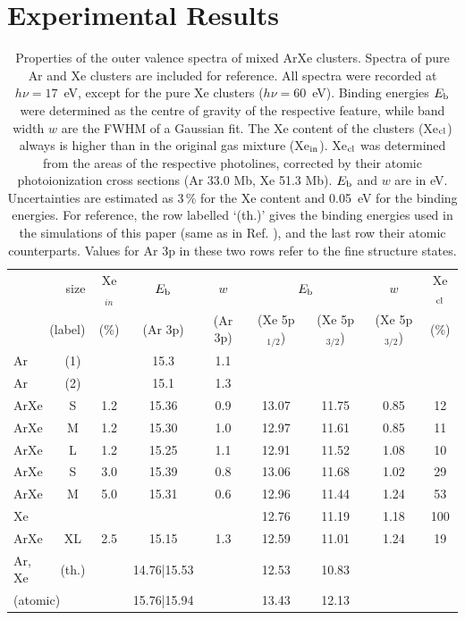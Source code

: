 \section{Experimental Results
\label{sec:exp_results}}


\begin{table}
\caption{Properties of the outer valence spectra of mixed ArXe clusters. 
Spectra of pure Ar and Xe clusters are included for reference. 
All spectra were recorded at $h\nu = 17$~eV, except for the pure Xe clusters ($h\nu = 60$~eV). 
Binding energies $E_{\rm b}$ were determined as the centre of gravity of the respective feature, while band width $w$ are the FWHM of a Gaussian fit. 
The Xe content of the clusters (Xe$_{\rm cl}$) always is higher than in the original gas mixture (Xe$_{\rm in}$). 
Xe$_{\rm cl}$ was determined from the areas of the respective photolines, corrected by their atomic photoionization cross sections (Ar 33.0 Mb, Xe 51.3 Mb)\cite{samson2002}. 
$E_{\rm b}$ and $w$ are in eV. 
Uncertainties are estimated as 3\,\% for the Xe content and 0.05~eV for the binding energies. 
For reference, the row labelled `(th.)' gives the binding energies used in the simulations of this paper (same as in Ref. ), and the last row their atomic counterparts. 
Values for Ar 3p in these two rows refer to the fine structure states.
\label{tab:valence} }
\begin{tabular}{ l c c c c c c c c}
%
\toprule
 \multicolumn{2}{r}{size} &  Xe$_{in}$& $E_{\rm b}$ & $w$& \multicolumn{2}{c}{$E_{\rm b}$}  & $w$ &  Xe$_{\rm cl}$ \\
%
 \multicolumn{2}{r}{(label)}&  (\%) & (Ar 3p) & (Ar 3p) & (Xe 5p$_{1/2}$) &  (Xe 5p$_{3/2}$) & (Xe 5p$_{3/2}$)  &  (\%) \\
\midrule
 Ar & (1) &&  15.3  &  1.1 & & & &  \\
 Ar & (2) &&  15.1  &  1.3 & & & &  \\
%
 ArXe & S &1.2 & 15.36 & 0.9 & 13.07 & 11.75 & 0.85 & 12\\
 ArXe & M &1.2 & 15.30 & 1.0 & 12.97 & 11.61 & 0.85 & 11\\
 ArXe & L &1.2 & 15.25 & 1.1 & 12.91 & 11.52 & 1.08 & 10\\
 ArXe & S &3.0 & 15.39 & 0.8 & 13.06 & 11.68 & 1.02 & 29\\
 ArXe & M &5.0 & 15.31 & 0.6 & 12.96 & 11.44 & 1.24 & 53\\
 Xe &  & & & & 12.76 & 11.19 & 1.18 & 100\\
%
\midrule
%
 ArXe & XL &2.5 & 15.15 & 1.3 & 12.59 & 11.01 & 1.24 & 19\\
%
\midrule
%
 Ar, Xe & (th.) && 14.76|15.53 && 12.53 & 10.83 &&\\
%
 \multicolumn{2}{l}{(atomic)\cite{velchev,sansonetti}} && 15.76|15.94 && 13.43 & 12.13 &&\\
%
\bottomrule
\end{tabular}
\end{table}


